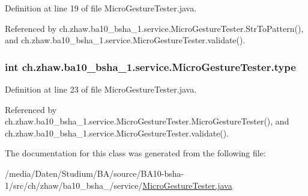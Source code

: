 Definition at line 19 of file MicroGestureTester.java.

Referenced by ch.zhaw.ba10\_\-bsha\_\-1.service.MicroGestureTester.StrToPattern(), and ch.zhaw.ba10\_\-bsha\_\-1.service.MicroGestureTester.validate().\hypertarget{classch_1_1zhaw_1_1ba10__bsha__1_1_1service_1_1MicroGestureTester_a1bf3c9be31f7a6293aa8e6d30e51fd56}{
\subsubsection[{type}]{\setlength{\rightskip}{0pt plus 5cm}int {\bf ch.zhaw.ba10\_\-bsha\_\-1.service.MicroGestureTester.type}}}
\label{classch_1_1zhaw_1_1ba10__bsha__1_1_1service_1_1MicroGestureTester_a1bf3c9be31f7a6293aa8e6d30e51fd56}


Definition at line 23 of file MicroGestureTester.java.

Referenced by ch.zhaw.ba10\_\-bsha\_\-1.service.MicroGestureTester.MicroGestureTester(), and ch.zhaw.ba10\_\-bsha\_\-1.service.MicroGestureTester.validate().

The documentation for this class was generated from the following file:\begin{DoxyCompactItemize}
\item 
/media/Daten/Studium/BA/source/BA10-\/bsha-\/1/src/ch/zhaw/ba10\_\-bsha\_/service/\hyperlink{MicroGestureTester_8java}{MicroGestureTester.java}\end{DoxyCompactItemize}
